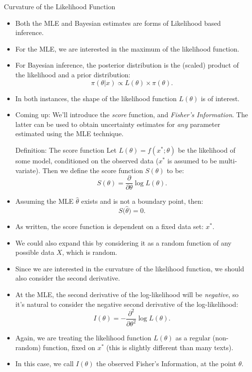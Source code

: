 \begin{frame}[allowframebreaks]{Curvature of the Likelihood Function}

\begin{itemize}
  \item Both the MLE and Bayesian estimates are forms of \alert{Likelihood based inference}.
  \item For the MLE, we are interested in the maximum of the likelihood function.
  \item For Bayesian inference, the posterior distribution is the (scaled) product of the likelihood and a prior distribution:
  $$
  \pi(\theta|x) \propto L(\theta) \times \pi(\theta).
  $$
  \item In both instances, the shape of the likelihood function $L(\theta)$ is of interest.

  \item \alert{Coming up:} We'll introduce the \emph{score} function, and \emph{Fisher's Information}. The latter can be used to obtain uncertainty estimates for \emph{any} parameter estimated using the MLE technique.

  \framebreak

  \begin{block}{Definition: The score function}
    Let $L(\theta) = f(x^*;\theta)$ be the likelihood of some model, conditioned on the observed data ($x^*$ is assumed to be multi-variate). Then we define the score function $S(\theta)$ to be:
    $$
    S(\theta) = \frac{\partial}{\partial \theta} \log L(\theta).
    $$
  \end{block}

  \item Assuming the MLE $\hat{\theta}$ exists and is not a boundary point, then:
  $$
  S\big(\hat{\theta}\big) = 0.
  $$

  \item As written, the score function is dependent on a fixed data set: $x^*$.
  \item We could also expand this by considering it as a random function of any possible data $X$, which is random.

  \framebreak

  \item Since we are interested in the curvature of the likelihood function, we should also consider the second derivative.
  \item At the MLE, the second derivative of the log-likelihood will be \emph{negative}, so it's natural to consider the negative second derivative of the log-likelihood:
  $$
  I(\theta) = -\frac{\partial^2}{\partial \theta^2} \log L(\theta).
  $$
  \item Again, we are treating the likelihood function $L(\theta)$ as a regular (non-random) function, fixed on $x^*$ (this is slightly different than many texts).
  \item In this case, we call $I(\theta)$ the \alert{observed Fisher's Information}, at the point $\theta$.


\end{itemize}
\end{frame}
